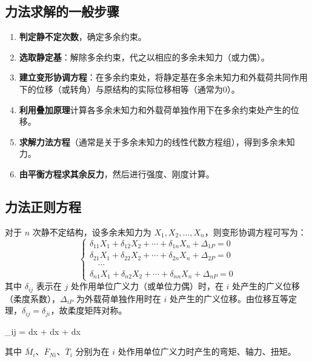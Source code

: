 \subsection{力法求解的一般步骤}
\begin{enumerate}
    \item \textbf{判定静不定次数}，确定多余约束。
    \item \textbf{选取静定基}：解除多余约束，代之以相应的多余未知力（或力偶）。
    \item \textbf{建立变形协调方程}：在多余约束处，将静定基在多余未知力和外载荷共同作用下的位移（或转角）与原结构的实际位移相等（通常为0）。
    \item \textbf{利用叠加原理}计算各多余未知力和外载荷单独作用下在多余约束处产生的位移。
    \item \textbf{求解力法方程}（通常是关于多余未知力的线性代数方程组），得到多余未知力。
    \item \textbf{由平衡方程求其余反力}，然后进行强度、刚度计算。
\end{enumerate}

\subsection{力法正则方程}
对于 \(n\) 次静不定结构，设多余未知力为 \(X_1, X_2, \dots, X_n\)，则变形协调方程可写为：
\[
\begin{cases}
    \delta_{11} X_1 + \delta_{12} X_2 + \cdots + \delta_{1n} X_n + \Delta_{1P} = 0 \\
    \delta_{21} X_1 + \delta_{22} X_2 + \cdots + \delta_{2n} X_n + \Delta_{2P} = 0 \\
    \quad \cdots \\
    \delta_{n1} X_1 + \delta_{n2} X_2 + \cdots + \delta_{nn} X_n + \Delta_{nP} = 0
\end{cases}
\]
其中 \(\delta_{ij}\) 表示在 \(j\) 处作用单位广义力（或单位力偶）时，在 \(i\) 处产生的广义位移（柔度系数），\(\Delta_{iP}\) 为外载荷单独作用时在 \(i\) 处产生的广义位移。由位移互等定理，\(\delta_{ij} = \delta_{ji}\)，故柔度矩阵对称。

\begin{myformula}
    \delta_{ij} = \int {} dx + \int {} dx + \int {} dx
\end{myformula}
其中 \(\overline{M}_i\)、\(\overline{F}_{Ni}\)、\(\overline{T}_i\) 分别为在 \(i\) 处作用单位广义力时产生的弯矩、轴力、扭矩。


